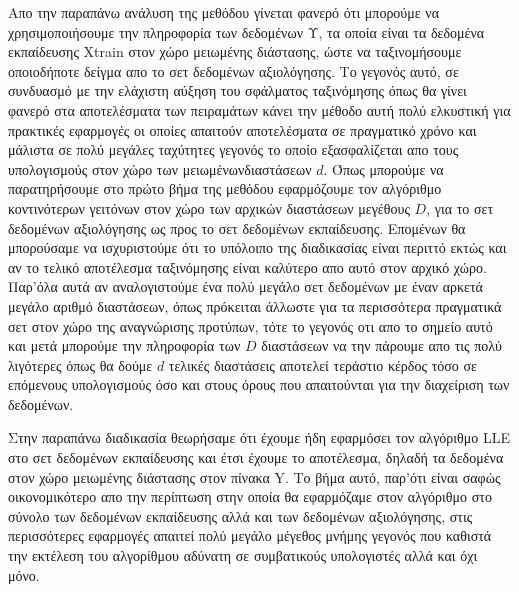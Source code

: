 \par
Απο την παραπάνω ανάλυση της μεθόδου γίνεται φανερό ότι μπορούμε να χρησιμοποιήσουμε την πληροφορία των δεδομένων Υ, τα οποία είναι τα δεδομένα εκπαίδευσης \textlatin{Xtrain} στον χώρο μειωμένης διάστασης, ώστε να ταξινομήσουμε οποιοδήποτε δείγμα απο το σετ δεδομένων αξιολόγησης. Το γεγονός αυτό, σε συνδυασμό με την ελάχιστη αύξηση του σφάλματος ταξινόμησης όπως θα γίνει φανερό στα αποτελέσματα των πειραμάτων κάνει την μέθοδο αυτή πολύ ελκυστική για πρακτικές εφαρμογές οι οποίες απαιτούν αποτελέσματα σε πραγματικό χρόνο και μάλιστα σε πολύ μεγάλες ταχύτητες γεγονός το οποίο εξασφαλίζεται απο τους υπολογισμούς στον χώρο των μειωμένωνδιαστάσεων $d$. Όπως μπορούμε να παρατηρήσουμε στο πρώτο βήμα της μεθόδου εφαρμόζουμε τον αλγόριθμο κοντινότερων γειτόνων στον χώρο των αρχικών διαστάσεων μεγέθους $D$, για το σετ δεδομένων αξιολόγησης ως προς το σετ δεδομένων εκπαίδευσης. Επομένων θα μπορούσαμε να ισχυριστούμε ότι το υπόλοιπο της διαδικασίας είναι περιττό εκτώς και αν το τελικό αποτέλεσμα ταξινόμησης είναι καλύτερο απο αυτό στον αρχικό χώρο. Παρ'όλα αυτά αν αναλογιστούμε ένα πολύ μεγάλο σετ δεδομένων με έναν αρκετά μεγάλο αριθμό διαστάσεων, όπως πρόκειται άλλωστε για τα περισσότερα πραγματικά σετ στον χώρο της αναγνώρισης προτύπων, τότε το γεγονός οτι απο το σημείο αυτό και μετά μπορούμε την πληροφορία των $D$ διαστάσεων να την πάρουμε απο τις πολύ λιγότερες όπως θα δούμε $d$ τελικές διαστάσεις αποτελεί τεράστιο κέρδος τόσο σε επόμενους υπολογισμούς όσο και στους όρους που απαιτούνται για την διαχείριση των δεδομένων.  
\par
Στην παραπάνω διαδικασία θεωρήσαμε ότι έχουμε ήδη εφαρμόσει τον αλγόριθμο \textlatin{LLE} στο σετ δεδομένων εκπαίδευσης και έτσι έχουμε το αποτέλεσμα, δηλαδή τα δεδομένα στον χώρο μειωμένης διάστασης στον πίνακα \textlatin{Y}. Το βήμα αυτό, παρ'ότι είναι σαφώς οικονομικότερο απο την περίπτωση στην οποία θα εφαρμόζαμε στον αλγόριθμο στο σύνολο των δεδομένων εκπαίδευσης αλλά και των δεδομένων αξιολόγησης, στις περισσότερες εφαρμογές απαιτεί πολύ μεγάλο μέγεθος μνήμης γεγονός που καθιστά την εκτέλεση του αλγορίθμου αδύνατη σε συμβατικούς υπολογιστές αλλά και όχι μόνο. 

